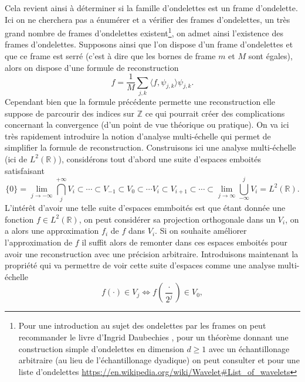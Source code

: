 Cela revient ainsi à déterminer si la famille d'ondelettes est un frame d'ondelette. 
Ici on ne cherchera pas a énumérer et a vérifier des frames d'ondelettes, un très grand nombre de frames d'ondelettes existent\footnote{Pour une introduction au sujet des ondelettes par les frames on peut recommander le livre d'Ingrid Daubechies \cite{daubbook}, pour un théorème donnant une construction simple d'ondelettes en dimension $d\geq 1$ avec un échantillonage arbitraire (au lieu de l'échantillonage dyadique) on peut consulter \cite{IrregWav} et pour une liste d'ondelettes \url{https://en.wikipedia.org/wiki/Wavelet#List_of_wavelets}}, on admet ainsi l'existence des frames d'ondelettes. 
\newline
Supposons ainsi que l'on dispose d'un frame d'ondelettes et que ce frame est serré (c'est à dire que les bornes de frame $m$ et $M$ sont égales), alors on dispose d'une formule de reconstruction
\begin{equation}
	f = \frac{1}{M} \sum_{j,k} \langle f, \psi_{j,k}\rangle \psi_{j,k}.
\end{equation}
Cependant bien que la formule précédente permette une reconstruction elle suppose de parcourir des indices sur $\mathbb{Z}$ ce qui pourrait créer des complications concernant la convergence (d'un point de vue théorique ou pratique).
On va ici très rapidement introduire la notion d'analyse multi-échelle qui permet de simplifier la formule de reconstruction.
Construisons ici une analyse multi-échelle (ici de $L^2(\mathbb{R})$), considérons tout d'abord une suite d'espaces emboités satisfaisant 
\begin{equation*}
	\{0\}=	\lim_{j\to -\infty} \bigcap_{j}^{+\infty} V_i \subset \cdots \subset V_{-1} \subset V_0 \subset \cdots V_i \subset V_{i+1} \subset \cdots \subset \lim_{j\to \infty} \bigcup_{-\infty}^{j} V_i = L^2(\mathbb{R}).  
\end{equation*}
L'intérêt d'avoir une telle suite d'espaces emmboités est que étant donnée une fonction $f\in L^2(\mathbb{R})$, on peut considérer sa projection orthogonale dans un $V_i$, on a alors une approximation $f_i$ de $f$ dans $V_i$.
Si on souhaite améliorer l'approximation de $f$ il suffit alors de remonter dans ces espaces emboités pour avoir une reconstruction avec une précision arbitraire.
Introduisons maintenant la propriété qui va permettre de voir cette suite d'espaces comme une analyse multi-échelle
\begin{equation}
	f(\cdot) \in V_j \iff f(\frac{\cdot}{2^j}) \in V_0,
\end{equation}

